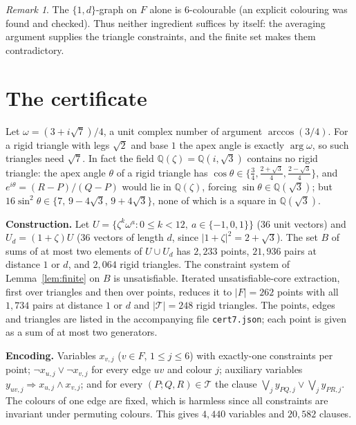 \documentclass[11pt,a4paper]{amsart}
\theoremstyle{remark}
\newtheorem{remark}[theorem]{Remark}
\newcommand{\Q}{\mathbb{Q}}
\begin{document}
\begin{remark}
The $\{1,d\}$-graph on $F$ alone is $6$-colourable (an explicit colouring was found and checked). Thus neither ingredient suffices by itself: the averaging argument supplies the triangle constraints, and the finite set makes them contradictory.
\end{remark}

\section{The certificate}\label{sec:cert}

Let $\omega=(3+i\sqrt7)/4$, a unit complex number of argument $\arccos(3/4)$. For a rigid triangle with legs $\sqrt2$ and base $1$ the apex angle is exactly $\arg\omega$, so such triangles need $\sqrt7$. In fact the field $\Q(\zeta)=\Q(i,\sqrt3)$ contains no rigid triangle: the apex angle $\theta$ of a rigid triangle has $\cos\theta\in\{\tfrac34,\tfrac{2+\sqrt3}4,\tfrac{2-\sqrt3}4\}$, and $e^{i\theta}=(R-P)/(Q-P)$ would lie in $\Q(\zeta)$, forcing $\sin\theta\in\Q(\sqrt3)$; but $16\sin^2\theta\in\{7,\,9-4\sqrt3,\,9+4\sqrt3\}$, none of which is a square in $\Q(\sqrt3)$.

\medskip\noindent\textbf{Construction.} Let $U=\{\zeta^k\omega^a:0\le k<12,\ a\in\{-1,0,1\}\}$ ($36$ unit vectors) and $U_d=(1+\zeta)U$ ($36$ vectors of length $d$, since $|1+\zeta|^2=2+\sqrt3$). The set $B$ of sums of at most two elements of $U\cup U_d$ has $2{,}233$ points, $21{,}936$ pairs at distance $1$ or $d$, and $2{,}064$ rigid triangles. The constraint system of Lemma~\ref{lem:finite} on $B$ is unsatisfiable. Iterated unsatisfiable-core extraction, first over triangles and then over points, reduces it to $|F|=262$ points with all $1{,}734$ pairs at distance $1$ or $d$ and $|\mathcal T|=248$ rigid triangles. The points, edges and triangles are listed in the accompanying file \texttt{cert7.json}; each point is given as a sum of at most two generators.

\medskip\noindent\textbf{Encoding.} Variables $x_{v,j}$ ($v\in F$, $1\le j\le6$) with exactly-one constraints per point; $\neg x_{u,j}\vee\neg x_{v,j}$ for every edge $uv$ and colour $j$; auxiliary variables $y_{uv,j}\Rightarrow x_{u,j}\wedge x_{v,j}$; and for every $(P;Q,R)\in\mathcal T$ the clause $\bigvee_j y_{PQ,j}\vee\bigvee_j y_{PR,j}$. The colours of one edge are fixed, which is harmless since all constraints are invariant under permuting colours. This gives $4{,}440$ variables and $20{,}582$ clauses.
\end{document}

